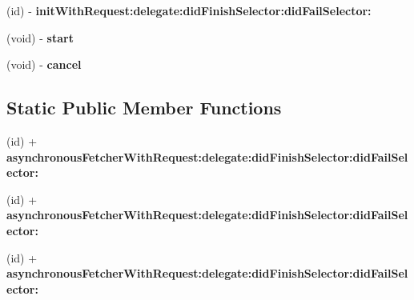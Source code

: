 \begin{DoxyCompactItemize}
\item 
\hypertarget{interface_o_a_asynchronous_data_fetcher_ac766d31ce49c8e2c942b200ad62d57ac}{
(id) -\/ {\bfseries init\-With\-Request\-:delegate\-:did\-Finish\-Selector\-:did\-Fail\-Selector\-:}}
\label{interface_o_a_asynchronous_data_fetcher_ac766d31ce49c8e2c942b200ad62d57ac}

\item 
\hypertarget{interface_o_a_asynchronous_data_fetcher_aa54831c11d914f5de957c82c18d18945}{
(void) -\/ {\bfseries start}}
\label{interface_o_a_asynchronous_data_fetcher_aa54831c11d914f5de957c82c18d18945}

\item 
\hypertarget{interface_o_a_asynchronous_data_fetcher_a72596f769dec2f2087d20bfdb9502c3e}{
(void) -\/ {\bfseries cancel}}
\label{interface_o_a_asynchronous_data_fetcher_a72596f769dec2f2087d20bfdb9502c3e}

\end{DoxyCompactItemize}
\subsection*{\-Static \-Public \-Member \-Functions}
\begin{DoxyCompactItemize}
\item 
\hypertarget{interface_o_a_asynchronous_data_fetcher_a6b81b9a95babde63ee0b804aded51ed4}{
(id) + {\bfseries asynchronous\-Fetcher\-With\-Request\-:delegate\-:did\-Finish\-Selector\-:did\-Fail\-Selector\-:}}
\label{interface_o_a_asynchronous_data_fetcher_a6b81b9a95babde63ee0b804aded51ed4}

\item 
\hypertarget{interface_o_a_asynchronous_data_fetcher_a6b81b9a95babde63ee0b804aded51ed4}{
(id) + {\bfseries asynchronous\-Fetcher\-With\-Request\-:delegate\-:did\-Finish\-Selector\-:did\-Fail\-Selector\-:}}
\label{interface_o_a_asynchronous_data_fetcher_a6b81b9a95babde63ee0b804aded51ed4}

\item 
\hypertarget{interface_o_a_asynchronous_data_fetcher_a6b81b9a95babde63ee0b804aded51ed4}{
(id) + {\bfseries asynchronous\-Fetcher\-With\-Request\-:delegate\-:did\-Finish\-Selector\-:did\-Fail\-Selector\-:}}
\label{interface_o_a_asynchronous_data_fetcher_a6b81b9a95babde63ee0b804aded51ed4}

\end{DoxyCompactItemize}
